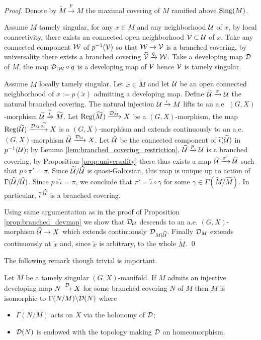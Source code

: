 \begin{proof} Denote by $\widetilde M \xrightarrow{p} M$ the maximal covering of $M$ ramified above $\mathrm{Sing}(M)$.


Assume $M$ tamely singular, for any $x\in M$ and any neighborhood $\mathcal{U}$ of $x$, by local connectivity, there exists an connected open neighborhood $\mathcal V\subset \mathcal{U}$  of $x$. Take any connected component $\mathcal W$ of $p^{-1}(\mathcal V)$ so that $\mathcal W\rightarrow \mathcal V $ is a branched covering, by universality there exists a branched covering $\widetilde {\mathcal V}\xrightarrow{q} \mathcal W$. Take a developing map $\mathcal{D}$ of $M$, the map $\mathcal{D}_{|\mathcal W}\circ q$ is a developing map of $\mathcal V$ hence $\mathcal V$ is tamely singular.

Assume $M$ locally tamely singular.
Let $\widetilde x\in \widetilde M$ and let $\mathcal{U}$ be an open connected neighborhood of $x:=p(\widetilde x)$ admitting a developing map. Define $\widetilde {\mathcal{U}} \xrightarrow{\pi} \mathcal{U}$ the natural branched covering. 
  The natural injection $\mathcal{U} \xrightarrow{\iota} M$ lifts to an a.e. $(G,X)$-morphism $\widetilde {\mathcal{U}}\xrightarrow{\widetilde \iota} \widetilde M$. 
  Let $\mathrm{Reg}(\widetilde M) \xrightarrow{\mathcal{D}_M} X$ be  a $(G,X)$-morphism,  the map $\mathrm{Reg}(\widetilde {\mathcal{U}}) \xrightarrow{\mathcal{D}_M\circ \widetilde \iota} X$ is a $(G,X)$-morphism and extends continuously to an a.e. $(G,X)$-morphism $\widetilde {\mathcal{U}}\xrightarrow{\mathcal{D}_{\mathcal{U}}} X$. Let $\hat {\mathcal{U}}$ be the connected component of $\widetilde \iota (\widetilde {\mathcal{U}})$ in $p^{-1}(\mathcal{U})$; by Lemma \ref{lem:branched_covering_restriction},  $\widehat {\mathcal{U}} \xrightarrow{p} \mathcal{U}$ is a branched covering, by Proposition \ref{prop:universality} there thus exists a  map $\widetilde {\mathcal{U}} \xrightarrow{\pi'} \widehat {\mathcal{U}}$  such that $p\circ \pi' = \pi $. Since $\widetilde {\mathcal{U}}/\widehat{\mathcal{U}}$ is quasi-Galoisian, this map is unique up to action of $\Gamma(\widetilde {\mathcal{U}}/\widehat {\mathcal{U}})$. Since $p \circ \widetilde \iota = \pi$, we conclude that $\pi' = \widetilde \iota \circ \gamma$ for some $\gamma \in \Gamma(\widetilde M/\widehat M)$. In particular, $\widetilde \iota^{|\widehat {\mathcal{U}}}$ is a branched covering.
  
  Using same argumentation as in the proof of Proposition \ref{prop:branched_devmap} we show that $\mathcal{D}_{\mathcal{U}}$ descends to an a.e. $(G,X)$-morphism  $\widehat {\mathcal{U}} \rightarrow X$ which extends continuously $\mathcal{D}_{M|\widehat {\mathcal{U}}}$.  Finally $\mathcal{D}_M$ extends continuously at $\widetilde x$ and, since $\widetilde x$ is arbitrary, to the whole $\widetilde M$.
 \qed\end{proof}
 
 The following remark though trivial is important.
 \begin{rem} Let $M$ be a tamely singular $(G,X)$-manifold. If $M$ admits an injective developing map $N\xrightarrow{\mathcal{D}}X$ for some branched covering $N$ of $M$ then $M$ is isomorphic to $\Gamma(N/M)\backslash\mathcal{D}(N)$ where 
 \begin{itemize}
  \item $\Gamma(N/M)$ acts on $X$ via the holonomy of $\mathcal{D}$;
  \item $\mathcal{D}(N)$ is endowed with the topology making  $\mathcal{D}$ an homeomorphism.
 \end{itemize} 
 \end{rem}

